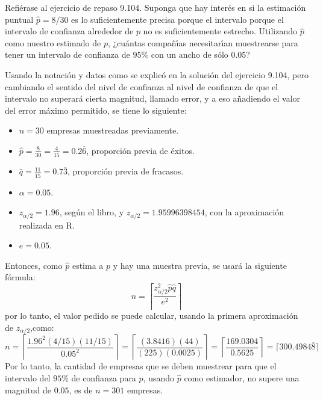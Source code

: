 \begin{enunciado}
 Refi\'erase al ejercicio de repaso 9.104. Suponga que hay inter\'es en si la estimaci\'on puntual $\hat{p} = 8/30$ es lo suficientemente precisa porque el intervalo porque el intervalo de confianza alrededor de $p$ no es suficientemente estrecho. Utilizando $\hat{p}$ como nuestro estimado de $p$, ¿cu\'antas compa\~n\'{\i}as necesitar\'{\i}an muestrearse para tener un intervalo de confianza de $95\%$ con un ancho de s\'olo $0.05$?
\end{enunciado}

\begin{solucion}
 Usando la notaci\'on y datos como se explic\'o en la soluci\'on del ejercicio 9.104, pero cambiando el sentido del nivel de confianza al nivel de confianza de que el intervalo no superar\'a cierta magnitud, llamado error, y a eso a\~nadiendo el valor del error m\'aximo permitido, se tiene lo siguiente:
 \begin{itemize}
  \item $n = 30$ empresas muestreadas previamente.
  \item $\hat{p} = \frac{8}{30} = \frac{4}{15} = 0.2\overline{6}$, proporci\'on previa de \'exitos.
  \item $\hat{q} = \frac{11}{15} = 0.7\overline{3}$, proporci\'on previa de fracasos.
  \item $\alpha = 0.05$.
  \item $z_{\alpha/2} = 1.96$, seg\'un el libro, y $z_{\alpha/2} = 1.95996398454$, con la aproximaci\'on realizada en R.
  \item $e = 0.05$. 
 \end{itemize}
 Entonces, como $\hat{p}$ estima a $p$ y hay una muestra previa, se usar\'a la siguiente f\'ormula:
 \begin{equation*}
  n = \left\lceil \frac{z_{\alpha/2}^2 \hat{p}\hat{q}}{e^2} \right\rceil
 \end{equation*}
 por lo tanto, el valor pedido se puede calcular, usando la primera aproximaci\'on de $z_{\alpha/2}$,como:
 \begin{equation*}
  n = \left\lceil \frac{1.96^2 (4/15)(11/15)}{0.05^2} \right\rceil =  \left\lceil \frac{(3.8416)(44)}{(225)(0.0025)} \right\rceil = \left\lceil \frac{169.0304}{0.5625} \right\rceil = \lceil 300.4984\overline{8} \rceil
 \end{equation*}
 Por lo tanto, la cantidad de empresas que se deben muestrear para que el intervalo del $95\%$ de confianza para $p$, usando $\hat{p}$ como estimador, no supere una magnitud de $0.05$, es de $n = 301$ empresas.

\end{solucion}
